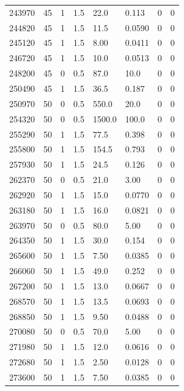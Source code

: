 \documentclass[preview]{standalone}
\begin{document}
{{{{{{{{\begin{tabular}{L{1.2cm}C{1.2cm} C{0.3cm}C{0.5cm} C{1.4cm}C{1.4cm} C{1.4cm}C{1.4cm}}
  243970  &    45  & 1     & 1.5 &  22.0  & 0.113  & 0 &  0   \\ 
  244820  &    45  & 1     & 1.5 &  11.5  & 0.0590  & 0 &  0   \\ 
  245120  &    45  & 1     & 1.5 &  8.00  & 0.0411  & 0 &  0   \\ 
  246720  &    45  & 1     & 1.5 &  10.0  & 0.0513  & 0 &  0   \\ 
  248200  &    45  & 0     & 0.5 &  87.0  & 10.0  & 0 &  0   \\ 
  250490  &    45  & 1     & 1.5 &  36.5  & 0.187  & 0 &  0   \\ 
  250970  &    50  & 0     & 0.5 &  550.0  & 20.0  & 0 &  0   \\ 
  254320  &    50  & 0     & 0.5 &  1500.0  & 100.0  & 0 &  0   \\ 
  255290  &    50  & 1     & 1.5 &  77.5  & 0.398  & 0 &  0   \\ 
  255800  &    50  & 1     & 1.5 &  154.5  & 0.793  & 0 &  0   \\ 
  257930  &    50  & 1     & 1.5 &  24.5  & 0.126  & 0 &  0   \\ 
  262370  &    50  & 0     & 0.5 &  21.0  & 3.00  & 0 &  0   \\ 
  262920  &    50  & 1     & 1.5 &  15.0  & 0.0770  & 0 &  0   \\ 
  263180  &    50  & 1     & 1.5 &  16.0  & 0.0821  & 0 &  0   \\ 
  263970  &    50  & 0     & 0.5 &  80.0  & 5.00  & 0 &  0   \\ 
  264350  &    50  & 1     & 1.5 &  30.0  & 0.154  & 0 &  0   \\ 
  265600  &    50  & 1     & 1.5 &  7.50  & 0.0385  & 0 &  0   \\ 
  266060  &    50  & 1     & 1.5 &  49.0  & 0.252  & 0 &  0   \\ 
  267200  &    50  & 1     & 1.5 &  13.0  & 0.0667  & 0 &  0   \\ 
  268570  &    50  & 1     & 1.5 &  13.5  & 0.0693  & 0 &  0   \\ 
  268850  &    50  & 1     & 1.5 &  9.50  & 0.0488  & 0 &  0   \\ 
  270080  &    50  & 0     & 0.5 &  70.0  & 5.00  & 0 &  0   \\ 
  271980  &    50  & 1     & 1.5 &  12.0  & 0.0616  & 0 &  0   \\ 
  272680  &    50  & 1     & 1.5 &  2.50  & 0.0128  & 0 &  0   \\ 
  273600  &    50  & 1     & 1.5 &  7.50  & 0.0385  & 0 &  0   \\ 
\hline 
\end{tabular} 

}}}}}}}}
\end{document}
